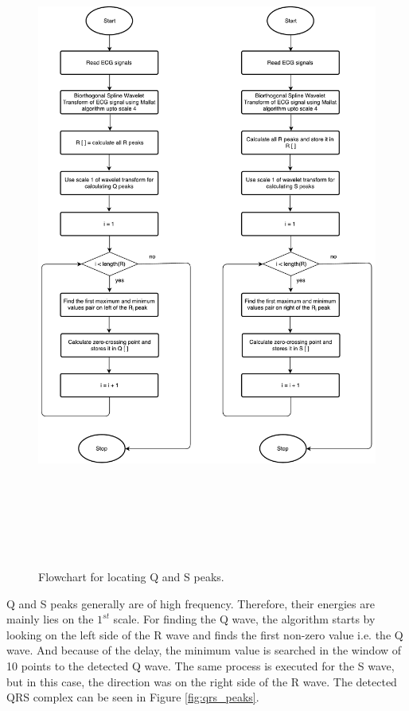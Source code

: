 \begin{figure}[htpb]
	\centering
	\includegraphics[width=25cm,height=22cm,keepaspectratio=true]{images/q-and-s.pdf}
	\caption{
		Flowchart for locating Q and S peaks.
	}
	\label{fig:qs}
\end{figure}

\bigskip

Q and S peaks generally are of high frequency. Therefore, their energies are mainly lies on the $1^{st}$ scale. For finding the Q wave, the algorithm starts by looking on the left side of the R wave and finds the first non-zero value i.e. the Q wave. And because of the delay, the minimum value is searched in the window of 10 points to the detected Q wave. The same process is executed for the S wave, but in this case, the direction was on the right side of the R wave. The detected QRS complex can be seen in Figure \ref{fig:qrs_peaks}.

